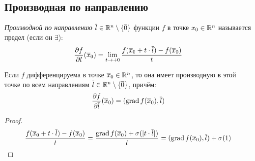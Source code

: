 \subsection{Производная по направлению}
\begin{definition}
	\textit{Производной по направлению} $\overline l\in\mathbb{R}^n\setminus\{\overline0\}$ функции $f$ в точке $x_0\in\mathbb{R}^n$ называется предел (если он $\exists$):
	\[\frac{\vd f}{\vd l}(\v x_0)=\lim_{t\ra+0}\frac{f(\v x_0+t\cdot\v l)-f(\v x_0)}{t}\] 
\end{definition}
\begin{theorem}
	Если $f$ дифференцируема в точке $\overline x_0\in\mathbb{R}^n$, то она имеет производную в этой точке по всем направлениям $\overline l\in\mathbb{R}^n\setminus\{\overline0\}$, причём:
	\[\frac{\partial f}{\partial\overline l}(\overline x_0)=(\operatorname{grad} f(\overline x_0),\overline l)\]
\end{theorem}
\begin{proof}
	\[\frac{f(\overline x_0+t\cdot\overline l)-f(\overline x_0)}{t}=\frac{\operatorname{grad} f(\overline x_0)+\sigma(|t\cdot\overline l|)}{t}=(\operatorname{grad} f(\overline x_0),\overline l)+\sigma(1)\]
\end{proof}
